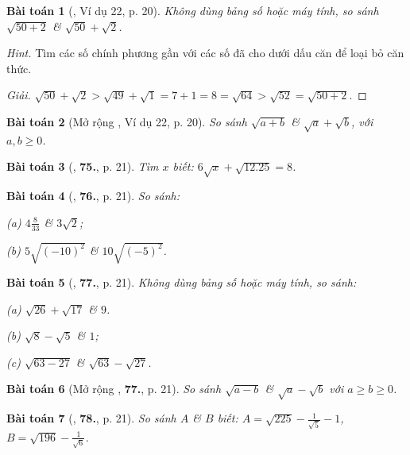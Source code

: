 \documentclass{article}
\numberwithin{equation}{section}
\newtheorem{baitoan}{Bài toán}
\begin{document}
\begin{baitoan}[\cite{Tuyen_Toan_7}, Ví dụ 22, p. 20]
	Không dùng bảng số hoặc máy tính, so sánh $\sqrt{50 + 2}$ \& $\sqrt{50} + \sqrt{2}$.
\end{baitoan}
\noindent\textit{Hint.} Tìm các số chính phương gần với các số đã cho dưới dấu căn để loại bỏ căn thức.

\begin{proof}[Giải]
	$\sqrt{50} + \sqrt{2} > \sqrt{49} + \sqrt{1} = 7 + 1 = 8 = \sqrt{64} > \sqrt{52} = \sqrt{50 + 2}$.
\end{proof}

\begin{baitoan}[Mở rộng \cite{Tuyen_Toan_7}, Ví dụ 22, p. 20]
	So sánh $\sqrt{a + b}$ \& $\sqrt{a} + \sqrt{b}$, với $a,b\ge 0$.
\end{baitoan}

\begin{baitoan}[\cite{Tuyen_Toan_7}, \textbf{75.}, p. 21]
	Tìm $x$ biết: $6\sqrt{x} + \sqrt{12.25} = 8$.
\end{baitoan}

\begin{baitoan}[\cite{Tuyen_Toan_7}, \textbf{76.}, p. 21]
	So sánh:
	\begin{enumerate*}
		\item[(a)] $4\frac{8}{33}$ \& $3\sqrt{2}$;
		\item[(b)] $5\sqrt{(-10)^2}$ \& $10\sqrt{(-5)^2}$.
	\end{enumerate*}
\end{baitoan}

\begin{baitoan}[\cite{Tuyen_Toan_7}, \textbf{77.}, p. 21]
	Không dùng bảng số hoặc máy tính, so sánh:
	\begin{enumerate*}
		\item[(a)] $\sqrt{26} + \sqrt{17}$ \& $9$.
		\item[(b)] $\sqrt{8} - \sqrt{5}$ \& $1$;
		\item[(c)] $\sqrt{63 - 27}$ \& $\sqrt{63} - \sqrt{27}$.
	\end{enumerate*}
\end{baitoan}

\begin{baitoan}[Mở rộng \cite{Tuyen_Toan_7}, \textbf{77.}, p. 21]
	So sánh $\sqrt{a - b}$ \& $\sqrt{a} - \sqrt{b}$ với $a\ge b\ge 0$.
\end{baitoan}

\begin{baitoan}[\cite{Tuyen_Toan_7}, \textbf{78.}, p. 21]
	So sánh $A$ \& $B$ biết: $A = \sqrt{225} - \frac{1}{\sqrt{5}} - 1$, $B = \sqrt{196} - \frac{1}{\sqrt{6}}$.
\end{baitoan}
\end{document}
